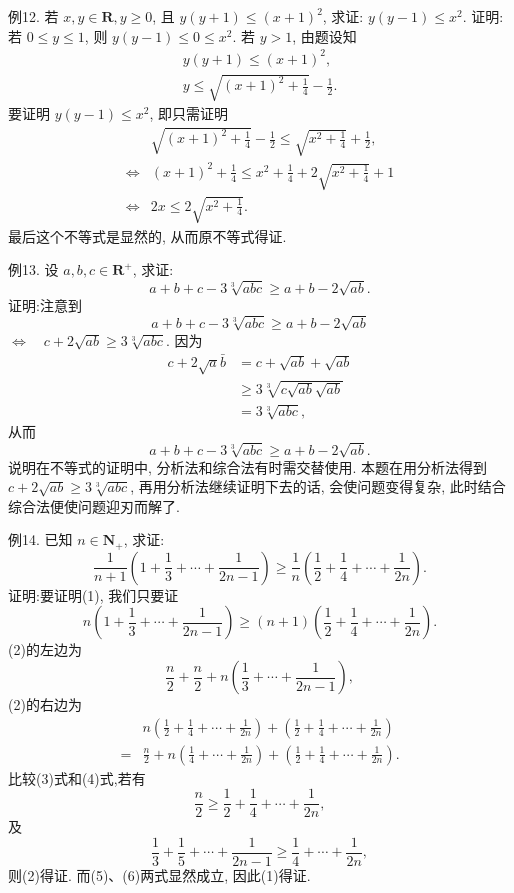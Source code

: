 例12. 若 $x, y \in \mathbf{R}, y \geqslant 0$, 且 $y(y+1) \leqslant(x+1)^2$, 求证: $y(y-1) \leqslant x^2$.
证明:若 $0 \leqslant y \leqslant 1$, 则 $y(y-1) \leqslant 0 \leqslant x^2$.
若 $y>1$, 由题设知
$$
\begin{gathered}
y(y+1) \leqslant(x+1)^2, \\
y \leqslant \sqrt{(x+1)^2+\frac{1}{4}}-\frac{1}{2} .
\end{gathered}
$$
要证明 $y(y-1) \leqslant x^2$, 即只需证明
$$
\begin{array}{lc} 
& \sqrt{(x+1)^2+\frac{1}{4}}-\frac{1}{2} \leqslant \sqrt{x^2+\frac{1}{4}}+\frac{1}{2}, \\
\Leftrightarrow & (x+1)^2+\frac{1}{4} \leqslant x^2+\frac{1}{4}+2 \sqrt{x^2+\frac{1}{4}}+1 \\
\Leftrightarrow & 2 x \leqslant 2 \sqrt{x^2+\frac{1}{4}} .
\end{array}
$$
最后这个不等式是显然的, 从而原不等式得证.



例13. 设 $a, b, c \in \mathbf{R}^{+}$, 求证:
$$
a+b+c-3 \sqrt[3]{a b c} \geqslant a+b-2 \sqrt{a b} .
$$
证明:注意到
$$
a+b+c-3 \sqrt[3]{a b c} \geqslant a+b-2 \sqrt{a b}
$$
$\Leftrightarrow \quad c+2 \sqrt{a b} \geqslant 3 \sqrt[3]{a b c}$.
因为
$$
\begin{aligned}
c+2 \sqrt{a} \bar{b} & =c+\sqrt{a b}+\sqrt{a b} \\
& \geqslant 3 \sqrt[3]{c \sqrt{a b} \sqrt{a b}} \\
& =3 \sqrt[3]{a b c},
\end{aligned}
$$
从而
$$
a+b+c-3 \sqrt[3]{a b c} \geqslant a+b-2 \sqrt{a b} .
$$
说明在不等式的证明中, 分析法和综合法有时需交替使用.
本题在用分析法得到 $c+2 \sqrt{a b} \geqslant 3 \sqrt[3]{a b c}$, 再用分析法继续证明下去的话, 会使问题变得复杂, 此时结合综合法便使问题迎刃而解了.



例14. 已知 $n \in \mathbf{N}_{+}$, 求证:
$$
\frac{1}{n+1}\left(1+\frac{1}{3}+\cdots+\frac{1}{2 n-1}\right) \geqslant \frac{1}{n}\left(\frac{1}{2}+\frac{1}{4}+\cdots+\frac{1}{2 n}\right) . \label{(1)}
$$
证明:要证明(1), 我们只要证
$$
n\left(1+\frac{1}{3}+\cdots+\frac{1}{2 n-1}\right) \geqslant(n+1)\left(\frac{1}{2}+\frac{1}{4}+\cdots+\frac{1}{2 n}\right) . \label{(2)}
$$
(2)的左边为
$$
\frac{n}{2}+\frac{n}{2}+n\left(\frac{1}{3}+\cdots+\frac{1}{2 n-1}\right), \label{(3)}
$$
(2)的右边为
$$
\begin{aligned}
& n\left(\frac{1}{2}+\frac{1}{4}+\cdots+\frac{1}{2 n}\right)+\left(\frac{1}{2}+\frac{1}{4}+\cdots+\frac{1}{2 n}\right) \\
= & \frac{n}{2}+n\left(\frac{1}{4}+\cdots+\frac{1}{2 n}\right)+\left(\frac{1}{2}+\frac{1}{4}+\cdots+\frac{1}{2 n}\right) .
\end{aligned} \label{(4)}
$$
比较(3)式和(4)式,若有
$$
\frac{n}{2} \geqslant \frac{1}{2}+\frac{1}{4}+\cdots+\frac{1}{2 n}, \label{(5)}
$$
及
$$
\frac{1}{3}+\frac{1}{5}+\cdots+\frac{1}{2 n-1} \geqslant \frac{1}{4}+\cdots+\frac{1}{2 n}, \label{(6)}
$$
则(2)得证.
而(5)、(6)两式显然成立, 因此(1)得证.



